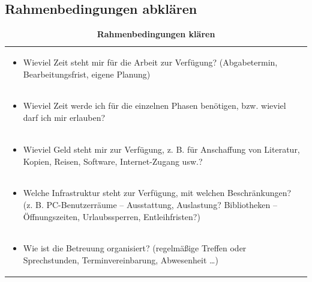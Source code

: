 \documentclass[]{book}
\providecommand{\tightlist}{%
  \setlength{\itemsep}{0pt}\setlength{\parskip}{0pt}}
\theoremstyle{definition}
\theoremstyle{definition}
\theoremstyle{definition}
\theoremstyle{remark}
\begin{document}
\subsection{Rahmenbedingungen
abklären}\label{rahmenbedingungen-abklaren}

\begin{longtable}[]{@{}l@{}}
\caption{\textbf{\label{tab:rahmenbedingungen} Rahmenbedingungen
klären}}\tabularnewline
\toprule
\begin{minipage}[t]{0.97\columnwidth}\raggedright\strut
\begin{itemize}
\tightlist
\item
  Wieviel Zeit steht mir für die Arbeit zur Verfügung? (Abgabetermin,
  Bearbeitungsfrist, eigene Planung)
\end{itemize}\strut
\end{minipage}\tabularnewline
\begin{minipage}[t]{0.97\columnwidth}\raggedright\strut
\begin{itemize}
\tightlist
\item
  Wieviel Zeit werde ich für die einzelnen Phasen benötigen, bzw.
  wieviel darf ich mir erlauben?
\end{itemize}\strut
\end{minipage}\tabularnewline
\begin{minipage}[t]{0.97\columnwidth}\raggedright\strut
\begin{itemize}
\tightlist
\item
  Wieviel Geld steht mir zur Verfügung, z. B. für Anschaffung von
  Literatur, Kopien, Reisen, Software, Internet-Zugang usw.?
\end{itemize}\strut
\end{minipage}\tabularnewline
\begin{minipage}[t]{0.97\columnwidth}\raggedright\strut
\begin{itemize}
\tightlist
\item
  Welche Infrastruktur steht zur Verfügung, mit welchen Beschränkungen?
  (z. B. PC-Benutzerräume -- Ausstattung, Auslastung? Bibliotheken --
  Öffnungszeiten, Urlaubssperren, Entleihfristen?)
\end{itemize}\strut
\end{minipage}\tabularnewline
\begin{minipage}[t]{0.97\columnwidth}\raggedright\strut
\begin{itemize}
\tightlist
\item
  Wie ist die Betreuung organisiert? (regelmäßige Treffen oder
  Sprechstunden, Terminvereinbarung, Abwesenheit \ldots{})
\end{itemize}\strut
\end{minipage}\tabularnewline
\bottomrule
\end{longtable}
\end{document}
